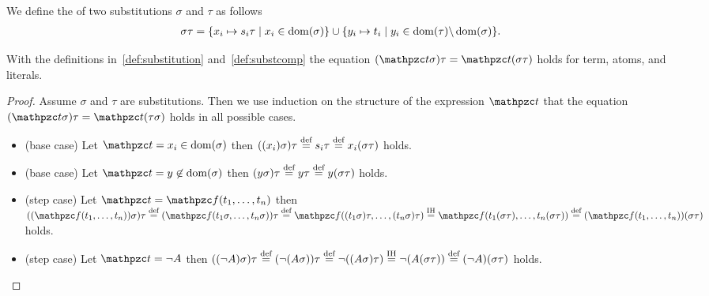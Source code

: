 \begin{definition}\label{def:substcomp}
We define the  of two substitutions \( \sigma \) and \( \tau \) as follows
	\begin{align*}
		\sigma\tau&=\{ x_i\mapsto s_i\tau\mid x_i\in\domain(\sigma) \}
		\cup
		\{ y_i\mapsto t_i\mid y_i\in\domain(\tau) \backslash \domain(\sigma) \}.
	\end{align*}
\end{definition}

\begin{lemma}\label{lem:substitution}
	With the definitions in~\ref{def:substitution} and~\ref{def:substcomp} the equation
	\( (\mct\sigma)\tau = \mct(\sigma\tau) \) holds for
	term, atoms, and literals.
\end{lemma}

\begin{proof}
	Assume \( \sigma \) and \( \tau \) are substitutions.
	Then we use induction on the structure of the 	expression \( \mct \)
	that the equation \( (\mct\sigma)\tau =  \mct(\tau\sigma) \) holds in all possible cases.
	\begin{itemize}
		\item (base case) Let \( \mct = x_i \in\domain(\sigma) \) then
		\( ((x_i)\sigma)\tau\defEQ s_i\tau\defEQ x_i(\sigma\tau) \) holds.

		\item (base case) Let \( \mct = y \not\in\domain(\sigma) \) then
		\( (y\sigma)\tau \defEQ y\tau \defEQ y(\sigma\tau) \) holds.

		\item (step case) Let \( \mct = \mcf(t_1,\ldots,t_n) \)
		then
		\(
			((\mcf(t_1,\ldots,t_n))\sigma)\tau
		\defEQ
		(\mcf(t_1\sigma,\ldots,t_n\sigma))\tau
		\defEQ
		\mcf((t_1\sigma)\tau,\ldots,(t_n\sigma)\tau)
		\defEQ[IH]
		\mcf(t_1(\sigma\tau),\ldots,t_n(\sigma\tau))
		\defEQ
		(\mcf(t_1,\ldots,t_n))(\sigma\tau)
		\) holds.

		\item (step case) Let \( \mct = \lnot A \) then
		\(
		((\lnot A)\sigma)\tau
		\defEQ
		(\lnot(A\sigma))\tau
		\defEQ
		\lnot((A\sigma)\tau)
		\defEQ[IH]
		\lnot(A(\sigma\tau))
		\defEQ
		(\lnot A)(\sigma\tau)
		\) holds.
	\end{itemize}
\end{proof}
